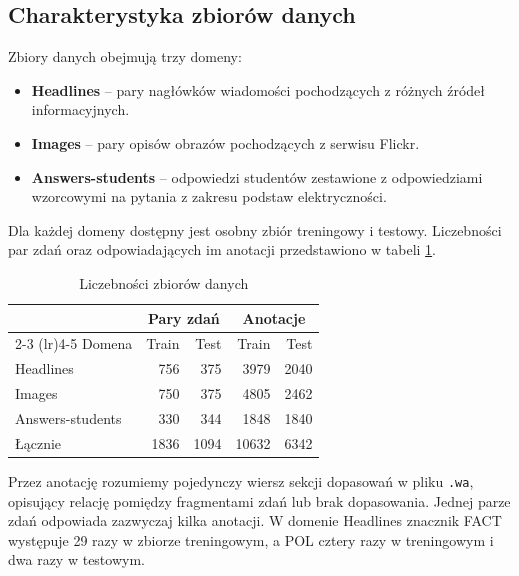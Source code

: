 \documentclass[a4paper,10pt]{article}
\begin{document}
\subsection{Charakterystyka zbiorów danych}

Zbiory danych obejmują trzy domeny:

\begin{itemize}
    \item \textbf{Headlines} -- pary nagłówków wiadomości
    pochodzących z różnych źródeł informacyjnych.

    \item \textbf{Images} -- pary opisów obrazów
    pochodzących z serwisu Flickr.

    \item \textbf{Answers-students} -- odpowiedzi
    studentów zestawione z odpowiedziami wzorcowymi
    na pytania z zakresu podstaw elektryczności.
\end{itemize}

Dla każdej domeny dostępny jest osobny zbiór treningowy
i testowy. Liczebności par zdań oraz odpowiadających
im anotacji przedstawiono w tabeli
\ref{tab:dataset_sizes}.

\begin{table}[htbp]
    \centering
    \caption{Liczebności zbiorów danych}
    \label{tab:dataset_sizes}
    \begin{tabular}{lrrrr}
        \toprule
        & \multicolumn{2}{c}{Pary zdań}
        & \multicolumn{2}{c}{Anotacje} \\
        \cmidrule(lr){2-3}
        \cmidrule(lr){4-5}
        Domena & Train & Test & Train & Test \\
        \midrule
        Headlines        & 756  & 375  & 3979  & 2040 \\
        Images           & 750  & 375  & 4805  & 2462 \\
        Answers-students & 330  & 344  & 1848  & 1840 \\
        \midrule
        Łącznie          & 1836 & 1094 & 10632 & 6342 \\
        \bottomrule
    \end{tabular}
\end{table}

Przez anotację rozumiemy pojedynczy wiersz sekcji
dopasowań w pliku \texttt{.wa}, opisujący relację
pomiędzy fragmentami zdań lub brak dopasowania.
Jednej parze zdań odpowiada zazwyczaj kilka anotacji.
W domenie Headlines znacznik FACT występuje 29 razy
w zbiorze treningowym, a POL cztery razy w treningowym
i dwa razy w testowym.
\end{document}
